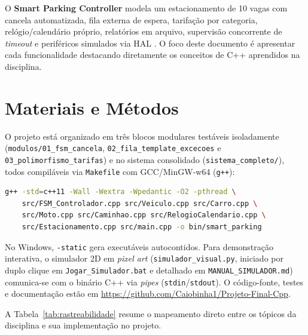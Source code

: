 \documentclass[10pt,twocolumn,a4paper]{article}
\newcommand{\code}[1]{\texttt{\footnotesize #1}}
\begin{document}
O \textbf{Smart Parking Controller} modela um estacionamento de 10 vagas com cancela automatizada, fila externa de espera, tarifação por categoria, relógio/calendário próprio, relatórios em arquivo, supervisão concorrente de \textit{timeout} e periféricos simulados via HAL \cite{bezerra2026eel7323}. O foco deste documento é apresentar cada funcionalidade destacando diretamente os conceitos de C++ aprendidos na disciplina.

\section{Materiais e Métodos}

O projeto está organizado em três blocos modulares testáveis isoladamente (\code{modulos/01\_fsm\_cancela}, \code{02\_fila\_template\_excecoes} e \code{03\_polimorfismo\_tarifas}) e no sistema consolidado (\code{sistema\_completo/}), todos compiláveis via \code{Makefile} com GCC/MinGW-w64 (\code{g++}):

\begin{lstlisting}[language=bash, numbers=none, float=ht, caption={Compilação do sistema completo (Linux/Windows).}]
g++ -std=c++11 -Wall -Wextra -Wpedantic -O2 -pthread \
    src/FSM_Controlador.cpp src/Veiculo.cpp src/Carro.cpp \
    src/Moto.cpp src/Caminhao.cpp src/RelogioCalendario.cpp \
    src/Estacionamento.cpp src/main.cpp -o bin/smart_parking
\end{lstlisting}

No Windows, \code{-static} gera executáveis autocontidos. Para demonstração interativa, o simulador 2D em \textit{pixel art} (\code{simulador\_visual.py}, iniciado por duplo clique em \code{Jogar\_Simulador.bat} e detalhado em \code{MANUAL\_SIMULADOR.md}) comunica-se com o binário C++ via \textit{pipes} (\code{stdin}/\code{stdout}). O código-fonte, testes e documentação estão em \url{https://github.com/Caiobinha1/Projeto-Final-Cpp}.

A Tabela~\ref{tab:rastreabilidade} resume o mapeamento direto entre os tópicos da disciplina e sua implementação no projeto.
\end{document}

